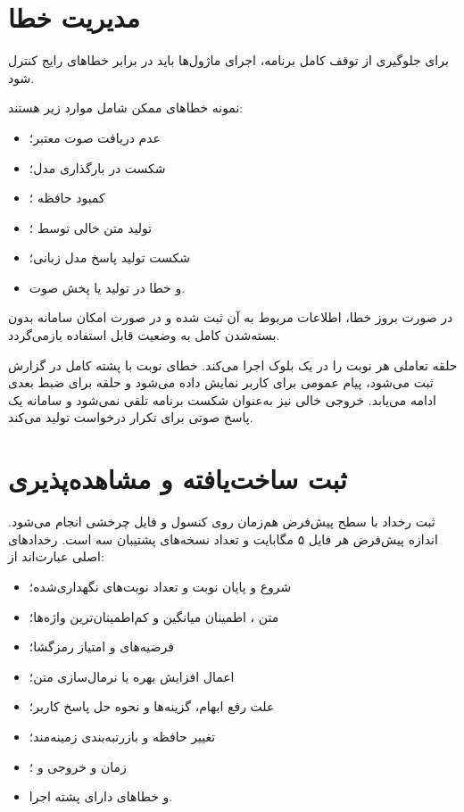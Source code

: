 \section{مدیریت خطا}

برای جلوگیری از توقف کامل برنامه، اجرای ماژول‌ها باید در برابر
خطاهای رایج کنترل شود.

نمونه خطاهای ممکن شامل موارد زیر هستند:

\begin{itemize}

    \item عدم دریافت صوت معتبر؛
    \item شکست در بارگذاری مدل؛
    \item کمبود حافظه ؛
    \item تولید متن خالی توسط ؛
    \item شکست تولید پاسخ مدل زبانی؛
    \item و خطا در تولید یا پخش صوت.
\end{itemize}

در صورت بروز خطا، اطلاعات مربوط به آن ثبت شده و در صورت امکان
سامانه بدون بسته‌شدن کامل به وضعیت قابل استفاده بازمی‌گردد.

حلقه تعاملی هر نوبت را در یک بلوک  اجرا می‌کند.
خطای نوبت با پشته کامل در گزارش ثبت می‌شود، پیام عمومی برای
کاربر نمایش داده می‌شود و حلقه برای ضبط بعدی ادامه می‌یابد.
خروجی خالی  نیز به‌عنوان شکست برنامه تلقی نمی‌شود و
سامانه یک پاسخ صوتی برای تکرار درخواست تولید می‌کند.


\section{ثبت ساخت‌یافته و مشاهده‌پذیری}

ثبت رخداد با سطح پیش‌فرض  هم‌زمان روی کنسول و فایل
چرخشی  انجام می‌شود. اندازه پیش‌فرض هر فایل ۵ مگابایت
و تعداد نسخه‌های پشتیبان سه است. رخدادهای اصلی عبارت‌اند از:

\begin{itemize}
    \item شروع و پایان نوبت و تعداد نوبت‌های نگهداری‌شده؛
    \item متن ، اطمینان میانگین و کم‌اطمینان‌ترین واژه‌ها؛
    \item فرضیه‌های  و امتیاز رمزگشا؛
    \item اعمال افزایش بهره یا نرمال‌سازی متن؛
    \item علت رفع ابهام، گزینه‌ها و نحوه حل پاسخ کاربر؛
    \item تغییر حافظه و بازرتبه‌بندی زمینه‌مند؛
    \item زمان و خروجی  و ؛
    \item و خطاهای دارای پشته اجرا.
\end{itemize}

